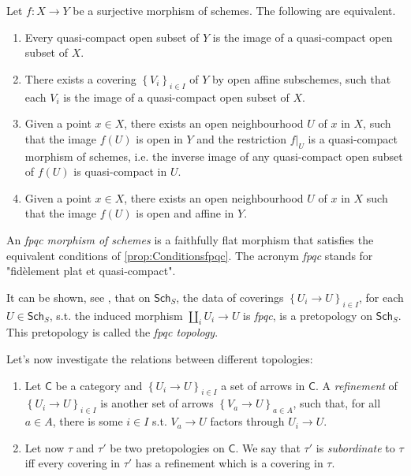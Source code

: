 \begin{prop}\label{prop:Conditionsfpqc}
	Let $f\colon X \to Y$ be a surjective morphism of schemes. The following are equivalent.
\begin{enumerate}
	\item Every quasi-compact open subset of $Y$ is the image of a quasi-compact
		open subset of $X$.
	\item There exists a covering $\left\{ V_i \right\}_{i \in I}$ of $Y$ by open affine 
		subschemes, such that each $V_i$ is the image of a quasi-compact
		open subset of $X$.
	\item Given a point $x \in X$, there exists an open neighbourhood $U$ of $x$
		in $X$, such that the image $f(U)$ is open in $Y$ and the restriction
		$\left.f\right|_{U}$ is a quasi-compact morphism of schemes, i.e.
		the inverse image of any quasi-compact open subset of $f(U)$ is
		quasi-compact in $U$.
	\item Given a point $x \in X$, there exists an open neighbourhood $U$ of $x$
		in $X$ such that the image $f(U)$ is open and affine in $Y$.
\end{enumerate}
\end{prop}


\begin{defn}
	An {\em fpqc morphism of schemes} is a faithfully flat morphism
	that satisfies the equivalent conditions of \cref{prop:Conditionsfpqc}.
	The acronym {\em fpqc} stands for "fidèlement plat et quasi-compact".
\end{defn}


\begin{rem}
	It can be shown, see \cite[\S 2.3.2]{Vistoli},
	that on $\mathsf{Sch}_{ S }$, the data
	of coverings $\left\{ U_{ i } \to U \right\}_{ i \in I }$, for each $U \in \mathsf{Sch}_{ S }$,
	s.t. the induced morphism $\amalg_i U_i \to U$ is {\em fpqc},
	is a pretopology on $\mathsf{Sch}_{ S }$.
	This pretopology is called the {\em fpqc topology}.
\end{rem}


\noindent
Let's now investigate the relations between different topologies:
\begin{defn}\leavevmode\vspace{-\baselineskip}
\begin{enumerate}
\item Let $\mathsf{C}$ be a category and $\left\{ U_{ i } \to U \right\}_{ i \in I }$
	a set of arrows in $\mathsf{C}$.
	A {\em refinement} of $\left\{ U_{ i } \to U \right\}_{ i \in I }$ is
	another set of arrows $\left\{ V_{ a } \to U \right\}_{ a \in A }$,
	such that, for all $a \in A$, there is some $i \in I$ s.t.
	$V_a \to U$ factors through $U_i \to U$.


\item Let now $\tau$ and $\tau'$ be two pretopologies on $\mathsf{C}$.
	We say that $\tau'$ is {\em subordinate} to $\tau$ iff
	every covering in $\tau'$ has a refinement which is
	a covering in $\tau$.
\end{enumerate}
\end{defn}


